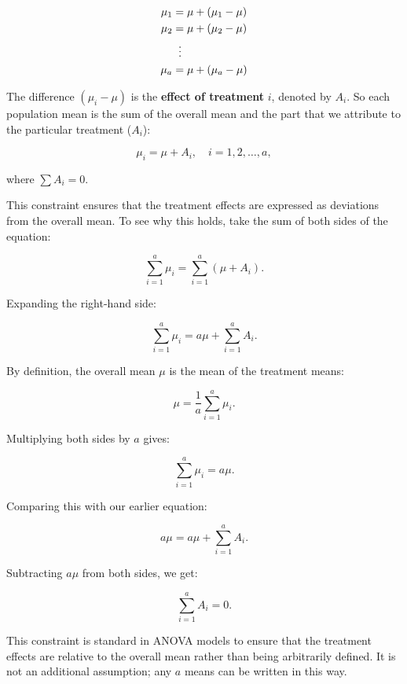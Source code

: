 \documentclass[
  letterpaper,
  DIV=11,
  numbers=noendperiod,
  oneside]{scrreprt}
\begin{document}
\begin{equation}
\begin{aligned}
\mu_1 &= \mu + (\mu_1 - \mu) \\
\mu_2 &= \mu + (\mu_2 - \mu) \\
&\;\;\vdots \notag \\
\mu_a &= \mu + (\mu_a - \mu)
\end{aligned}
\end{equation}

The difference \((\mu_i - \mu)\) is the \textbf{effect of treatment}
\(i\), denoted by \(A_i\). So each population mean is the sum of the
overall mean and the part that we attribute to the particular treatment
(\(A_i\)):

\[
\mu_i = \mu + A_i, \quad i = 1, 2, \dots, a,
\]

where \(\sum A_i = 0\).

\begin{tcolorbox}[enhanced jigsaw, toprule=.15mm, colbacktitle=quarto-callout-caution-color!10!white, toptitle=1mm, left=2mm, colframe=quarto-callout-caution-color-frame, bottomrule=.15mm, titlerule=0mm, breakable, opacitybacktitle=0.6, colback=white, coltitle=black, opacityback=0, bottomtitle=1mm, title={Why the \(\sum A_i = 0\) constraint?}, rightrule=.15mm, arc=.35mm, leftrule=.75mm]

This constraint ensures that the treatment effects are expressed as
deviations from the overall mean. To see why this holds, take the sum of
both sides of the equation:

\[
\sum_{i=1}^{a} \mu_i = \sum_{i=1}^{a} (\mu + A_i).
\]

Expanding the right-hand side:

\[
\sum_{i=1}^{a} \mu_i = a\mu + \sum_{i=1}^{a} A_i.
\]

By definition, the overall mean \(\mu\) is the mean of the treatment
means:

\[
\mu = \frac{1}{a} \sum_{i=1}^{a} \mu_i.
\]

Multiplying both sides by \(a\) gives:

\[
\sum_{i=1}^{a} \mu_i = a\mu.
\]

Comparing this with our earlier equation:

\[
a\mu = a\mu + \sum_{i=1}^{a} A_i.
\]

Subtracting \(a\mu\) from both sides, we get:

\[
\sum_{i=1}^{a} A_i = 0.
\]

This constraint is standard in ANOVA models to ensure that the treatment
effects are relative to the overall mean rather than being arbitrarily
defined. It is not an additional assumption; any \(a\) means can be
written in this way.

\end{tcolorbox}
\end{document}
